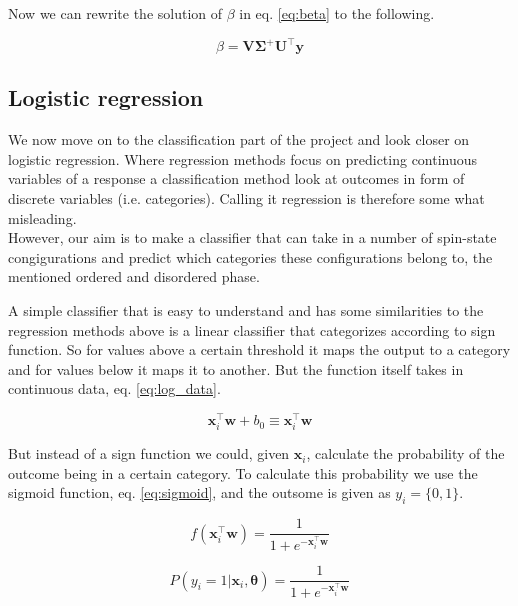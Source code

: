 \documentclass[a4paper,12pt, english]{article}
\begin{document}
Now we can rewrite the solution of $\beta$ in eq. \ref{eq:beta} to the following.

\begin{equation*}
\beta = \mathbf{V} \mathbf{\Sigma}^+ \mathbf{U}^\top \mathbf{y}
\end{equation*}

\subsection{Logistic regression}

We now move on to the classification part of the project and look closer on logistic regression. Where regression methods focus on predicting continuous variables of a response a classification method look at outcomes in form of discrete variables (i.e. categories). Calling it regression is therefore some what misleading. \\
However, our aim is to make a classifier that can take in a number of spin-state congigurations and predict which categories these configurations belong to, the mentioned ordered and disordered phase.

A simple classifier that is easy to understand and has some similarities to the regression methods above is a linear classifier that categorizes according to sign function. So for values above a certain threshold it maps the output to a category and for values below it maps it to another. But the function itself takes in continuous data, eq. \ref{eq:log_data}.

\begin{equation} \label{eq:log_data}
\mathbf{x}_i^{\top} \mathbf{w} + b_0 \equiv \mathbf{x}_i^{\top} \mathbf{w} 
\end{equation}

But instead of a sign function we could, given $\mathbf{x}_i$, calculate the probability of the outcome being in a certain category. To calculate this probability we use the sigmoid function, eq. \ref{eq:sigmoid}, and the outsome is given as $y_i = \{0,1\}$.

\begin{equation} \label{eq:sigmoid}
f(\mathbf{x}_i^{\top} \mathbf{w}) = \frac{1}{1 + e^{-\mathbf{x}_i^{\top} \mathbf{w}}}
\end{equation} 

\begin{equation*}
P(y_i = 1|\mathbf{x}_i,\mathbf{\theta}) = \frac{1}{1 + e^{-\mathbf{x}_i^{\top} \mathbf{w}}}
\end{equation*}
\end{document}
